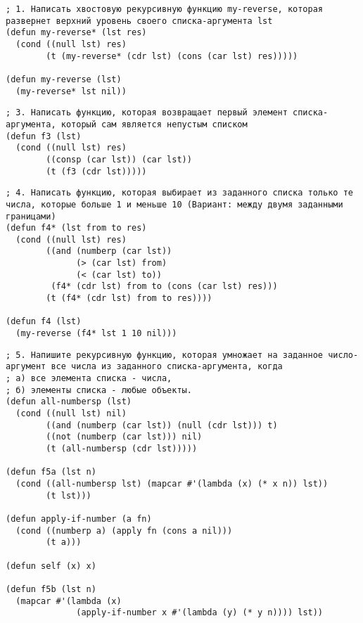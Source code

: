 \documentclass[a4paper,oneside,14pt]{extarticle}
\begin{document}

\setcounter{page}{2}
\renewcommand{\contentsname}{СОДЕРЖАНИЕ}


\begin{lstlisting}
; 1. Написать хвостовую рекурсивную функцию my-reverse, которая развернет верхний уровень своего списка-аргумента lst
(defun my-reverse* (lst res)
  (cond ((null lst) res)
        (t (my-reverse* (cdr lst) (cons (car lst) res)))))

(defun my-reverse (lst)
  (my-reverse* lst nil))
\end{lstlisting}

\begin{lstlisting}
; 3. Написать функцию, которая возвращает первый элемент списка-аргумента, который сам является непустым списком
(defun f3 (lst)
  (cond ((null lst) res)
        ((consp (car lst)) (car lst))
        (t (f3 (cdr lst)))))
\end{lstlisting}

\begin{lstlisting}
; 4. Написать функцию, которая выбирает из заданного списка только те числа, которые больше 1 и меньше 10 (Вариант: между двумя заданными границами)
(defun f4* (lst from to res)
  (cond ((null lst) res)
        ((and (numberp (car lst))
              (> (car lst) from) 
              (< (car lst) to))
         (f4* (cdr lst) from to (cons (car lst) res)))
        (t (f4* (cdr lst) from to res))))

(defun f4 (lst)
  (my-reverse (f4* lst 1 10 nil)))
\end{lstlisting}

\begin{lstlisting}
; 5. Напишите рекурсивную функцию, которая умножает на заданное число-аргумент все числа из заданного списка-аргумента, когда
; a) все элемента списка - числа,
; б) элементы списка - любые объекты.
(defun all-numbersp (lst)
  (cond ((null lst) nil)
        ((and (numberp (car lst)) (null (cdr lst))) t)
        ((not (numberp (car lst))) nil)
        (t (all-numbersp (cdr lst)))))

(defun f5a (lst n)
  (cond ((all-numbersp lst) (mapcar #'(lambda (x) (* x n)) lst))
        (t lst)))

(defun apply-if-number (a fn)
  (cond ((numberp a) (apply fn (cons a nil)))
        (t a)))

(defun self (x) x)

(defun f5b (lst n)
  (mapcar #'(lambda (x)
              (apply-if-number x #'(lambda (y) (* y n)))) lst))
\end{lstlisting}
\end{document}
